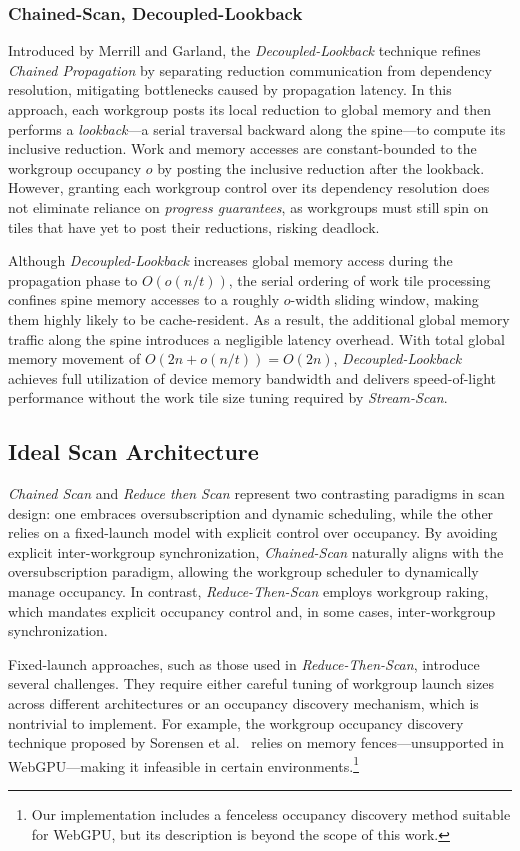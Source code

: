 \documentclass[sigconf]{acmart}
\begin{document}
\subsubsection{Chained-Scan, Decoupled-Lookback}
Introduced by Merrill and Garland, the \emph{Decoupled-Lookback} technique refines \emph{Chained Propagation} by separating reduction communication from dependency resolution, mitigating bottlenecks caused by propagation latency. In this approach, each workgroup posts its local reduction to global memory and then performs a \emph{lookback}---a serial traversal backward along the spine---to compute its inclusive reduction. Work and memory accesses are constant-bounded to the workgroup occupancy $o$ by posting the inclusive reduction after the lookback. However, granting each workgroup control over its dependency resolution does not eliminate reliance on \emph{progress guarantees}, as workgroups must still spin on tiles that have yet to post their reductions, risking deadlock.

Although \emph{Decoupled-Lookback} increases global memory access during the propagation phase to $O(o(n/t))$, the serial ordering of work tile processing confines spine memory accesses to a roughly $o$-width sliding window, making them highly likely to be cache-resident. As a result, the additional global memory traffic along the spine introduces a negligible latency overhead. With total global memory movement of $O(2n+o(n/t))= O(2n)$, \emph{Decoupled-Lookback} achieves full utilization of device memory bandwidth and delivers speed-of-light performance without the work tile size tuning required by \emph{Stream-Scan}.

\subsection{Ideal Scan Architecture}
\emph{Chained Scan} and \emph{Reduce then Scan} represent two contrasting paradigms in scan design: one embraces oversubscription and dynamic scheduling, while the other relies on a fixed-launch model with explicit control over occupancy. By avoiding explicit inter-workgroup synchronization, \emph{Chained-Scan} naturally aligns with the oversubscription paradigm, allowing the workgroup scheduler to dynamically manage occupancy. In contrast, \emph{Reduce-Then-Scan} employs workgroup raking, which mandates explicit occupancy control and, in some cases, inter-workgroup synchronization.

Fixed-launch approaches, such as those used in \emph{Reduce-Then-Scan}, introduce several challenges. They require either careful tuning of workgroup launch sizes across different architectures or an occupancy discovery mechanism, which is nontrivial to implement. For example, the workgroup occupancy discovery technique proposed by Sorensen et al.~\cite{sorensen2016} relies on memory fences—unsupported in WebGPU—making it infeasible in certain environments.\footnote{Our implementation includes a fenceless occupancy discovery method suitable for WebGPU, but its description is beyond the scope of this work.}
\end{document}
